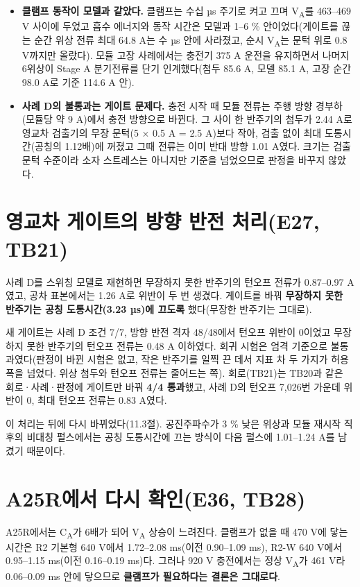 \begin{itemize}
\item \textbf{클램프 동작이 모델과 같았다.} 클램프는 수십 µs 주기로 켜고 끄며 V\textsubscript{A}를 463–469 V 사이에 두었고 흡수 에너지와 동작 시간은 모델과 1–6 \% 안이었다(게이트를 끊는 순간 위상 전류 최대 64.8 A는 수 µs 안에 사라졌고, 순시 V\textsubscript{A}는 문턱 위로 0.8 V까지만 올랐다). 모듈 고장 사례에서는 충전기 375 A 운전을 유지하면서 나머지 6위상이 Stage A 분기전류를 단기 인계했다(첨두 85.6 A, 모델 85.1 A, 고장 순간 98.0 A로 기준 114.6 A 안).
\item \textbf{사례 D의 불통과는 게이트 문제다.} 충전 시작 때 모듈 전류는 주행 방향 경부하(모듈당 약 9 A)에서 충전 방향으로 바뀐다. 그 사이 한 반주기의 첨두가 2.44 A로 영교차 검출기의 무장 문턱(5 × 0.5 A = 2.5 A)보다 작아, 검출 없이 최대 도통시간(공칭의 1.12배)에 꺼졌고 그때 전류는 이미 반대 방향 1.01 A였다. 크기는 검출 문턱 수준이라 소자 스트레스는 아니지만 기준을 넘었으므로 판정을 바꾸지 않았다.
\end{itemize}

\section{영교차 게이트의 방향 반전 처리(E27, TB21)}

사례 D를 스위칭 모델로 재현하면 무장하지 못한 반주기의 턴오프 전류가 0.87–0.97 A였고, 공차 표본에서는 1.26 A로 위반이 두 번 생겼다. 게이트를 바꿔 \textbf{무장하지 못한 반주기는 공칭 도통시간(3.23 µs)에 끄도록} 했다(무장한 반주기는 그대로).

새 게이트는 사례 D 조건 7/7, 방향 반전 격자 48/48에서 턴오프 위반이 0이었고 무장하지 못한 반주기의 턴오프 전류는 0.48 A 이하였다. 회귀 시험은 엄격 기준으로 불통과였다(판정이 바뀐 시험은 없고, 작은 반주기를 일찍 끈 데서 지표 차 두 가지가 허용폭을 넘었다. 위상 첨두와 턴오프 전류는 줄어드는 쪽). 회로(TB21)는 TB20과 같은 회로·사례·판정에 게이트만 바꿔 \textbf{4/4 통과}했고, 사례 D의 턴오프 7,026번 가운데 위반이 0, 최대 턴오프 전류는 0.83 A였다.

이 처리는 뒤에 다시 바뀌었다(11.3절). 공진주파수가 3 \% 낮은 위상과 모듈 재시작 직후의 비대칭 펄스에서는 공칭 도통시간에 끄는 방식이 다음 펄스에 1.01–1.24 A를 남겼기 때문이다.

\section{A25R에서 다시 확인(E36, TB28)}

A25R에서는 C\textsubscript{A}가 6배가 되어 V\textsubscript{A} 상승이 느려진다. 클램프가 없을 때 470 V에 닿는 시간은 R2 기본형 640 V에서 1.72–2.08 ms(이전 0.90–1.09 ms), R2-W 640 V에서 0.95–1.15 ms(이전 0.16–0.19 ms)다. 그러나 920 V 충전에서는 정상 V\textsubscript{A}가 461 V라 0.06–0.09 ms 안에 닿으므로 \textbf{클램프가 필요하다는 결론은 그대로다}.

